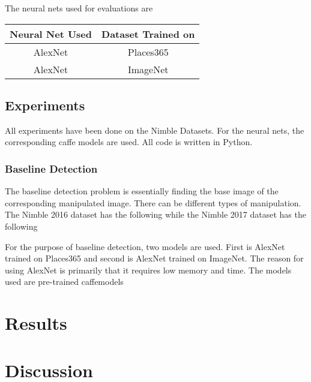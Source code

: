 \documentclass{article}
\begin{document}
The neural nets used for evaluations are
\begin{center}
  \begin{tabular}{|c|c|}
    \hline
    Neural Net Used & Dataset Trained on \\
    \hline
    AlexNet & Places365 \\
    \hline
    AlexNet & ImageNet \\
    \hline
  \end{tabular}
\end{center}
\subsection{Experiments}
All experiments have been done on the Nimble Datasets. For the neural nets, the corresponding caffe models are used. All code is written in Python.
\subsubsection{Baseline Detection}
The baseline detection problem is essentially finding the base image of the corresponding manipulated image. There can be different types of manipulation. The Nimble 2016 dataset has the following
while the Nimble 2017 dataset has the following

For the purpose of baseline detection, two models are used. First is AlexNet trained on Places365 and second is AlexNet trained on ImageNet. The reason for using AlexNet is primarily that it requires low memory and time. The models used are pre-trained caffemodels %




\section{Results}
\section{Discussion}
\end{document}
